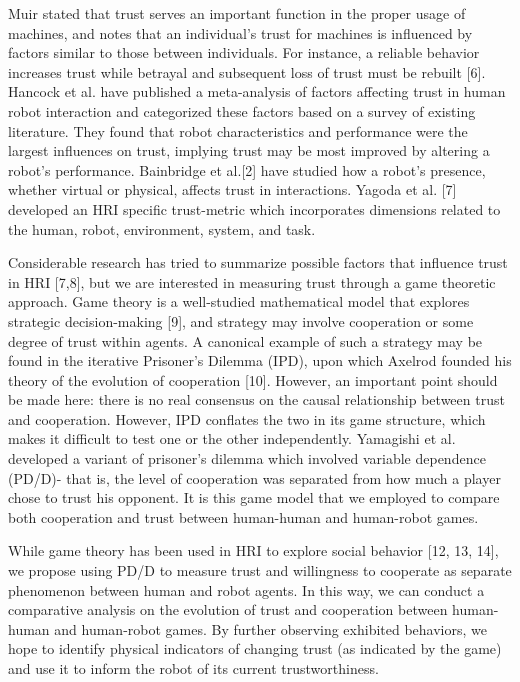 \documentclass{sig-alternate}
\begin{document}
Muir stated that trust serves an important function in the proper usage of machines, and notes that an individual's trust for machines is influenced by factors similar to those between individuals. For instance, a reliable behavior increases trust while betrayal and subsequent loss of trust must be rebuilt [6].  Hancock et al. \cite{hancock2011meta} have published a meta-analysis of factors affecting trust in human robot interaction and categorized these factors based on a survey of existing literature. They found that robot characteristics and performance were the largest influences on trust, implying trust may be most improved by altering a robot's performance. Bainbridge et al.[2] have studied how a robot's presence, whether virtual or physical, affects trust in interactions. Yagoda et al. [7] developed an HRI specific trust-metric which incorporates dimensions related to the human, robot, environment, system, and task. 

Considerable research has tried to summarize possible factors that influence trust in HRI [7,8], but  we are interested in measuring trust through a game theoretic approach. Game theory is a well-studied mathematical model that explores strategic decision-making [9], and strategy may involve cooperation or some degree of trust within agents. A canonical example of such a strategy may be found in the iterative Prisoner's Dilemma (IPD), upon which Axelrod founded his theory of the evolution of cooperation [10]. However, an important point should be made here: there is no real consensus on the causal relationship between trust and cooperation. However, IPD conflates the two in its game structure, which makes it difficult to test one or the other independently. Yamagishi et al. \cite{yamagishi2005separating} developed a variant of prisoner's dilemma which involved variable dependence (PD/D)- that is, the level of cooperation was separated from how much a player chose to trust his opponent. It is this game model that we employed to compare both cooperation and trust between human-human and human-robot games.

While game theory has been used in HRI to explore social behavior [12, 13, 14], we propose using PD/D to measure trust and willingness to cooperate as separate phenomenon between human and robot agents. In this way, we can conduct a comparative analysis on the evolution of trust and cooperation between human-human and human-robot games. By further observing exhibited behaviors, we hope to identify physical indicators of changing trust (as indicated by the game) and use it to inform the robot of its current trustworthiness.
\end{document}

